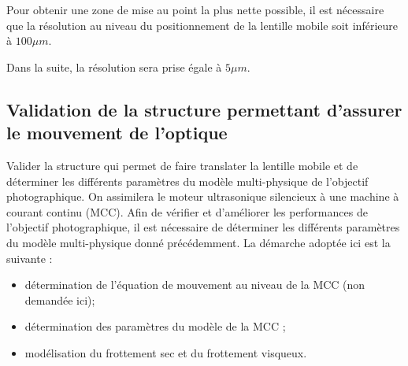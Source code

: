 


Pour obtenir une zone de mise au point la plus nette possible, il est
nécessaire que la résolution au niveau du positionnement de la lentille
mobile soit inférieure à $100\mu m$.




Dans la suite, la résolution sera prise égale à $5 \mu m$.



\subsection{Validation de la structure permettant d'assurer le mouvement de l'optique}\label{validation-de-la-structure-permettant-dassurer-le-mouvement-de-loptique}

\begin{objectif}
Valider la structure qui permet de faire translater la lentille mobile
et de déterminer les différents paramètres du modèle multi-physique de
l'objectif photographique. On assimilera le moteur ultrasonique silencieux à une machine à courant continu (MCC).
Afin de vérifier et d'améliorer les performances de l'objectif
photographique, il est nécessaire de déterminer les différents
paramètres du modèle multi-physique donné précédemment. La démarche
adoptée ici est la suivante :

\begin{itemize}
\item
  détermination de l'équation de mouvement au niveau de la MCC (non demandée ici);
\item
  détermination des paramètres du modèle de la MCC ;
\item
  modélisation du frottement sec et du frottement visqueux.
  \end{itemize}
\end{objectif}


